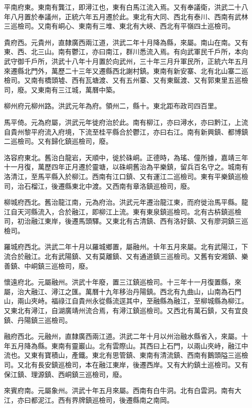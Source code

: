 平南府東。東南有龔江，即潯江也，東有白馬江流入焉。又有奉議衛，洪武二十八年八月置於奉議州，正統六年五月遷於此。東北有大同、西北有泰川、西南有武林三巡檢司。又南有峒心、東南有三堆、東北有大峽、西北有平嶺四土巡檢司。

貴府西。元貴州，直隸廣西兩江道，洪武二年十月降為縣，來屬。南山在南。又有東、西、北三山。南有鬱江，亦曰南江，群川悉流入焉。有向武軍民千戶所，本向武守御千戶所，洪武十八年十月置於向武州，三十年三月升軍民所，正統六年五月來遷縣北門外，萬歷二十三年又遷縣西北謝村鎮。東南有新安寨、北有北山寨二巡檢司。又南有橋頭墟、西有瓦塘渡、又有五州寨、又有東鋋渡、又有郭東里五巡檢司，廢。又東南有三江城，萬曆中築。

柳州府元柳州路。洪武元年為府。領州二，縣十。東北距布政司四百里。

馬平倚。元為府屬，洪武元年徙府治於此。南有柳江，亦曰潯水，亦曰黔江，上流自貴州黎平府流入府境，下流至桂平縣合於鬱江，亦曰右江。南有新興鎮、都博鎮二巡檢司。又有歸化鎮巡檢司，廢。

洛容府東北。舊治白龍岩，天順中，徙於硃峒。正德時，為瑤、僮所據，嘉靖三年十一月復，萬歷四年正月遷於靈塘，以硃峒舊治為平樂鎮，留兵百名守之。城南有洛清江，至馬平縣入於柳江。西南有江口鎮、又有運江二巡檢司。東有平樂鎮巡檢司，治石榴江，後遷縣東北中渡。又西南有章洛鎮巡檢司，廢。

柳城府西北。舊治龍江南，元為府治。洪武元年遷治龍江東，而府徙治馬平縣。龍江自天河縣流入，合於融江，即柳江上流。東有東泉鎮巡檢司。北有古枿鎮巡檢司，初治融江東岸，後遷馬頭驛。又東北有古清鎮、西有洛好鎮、又有廖洞鎮三巡檢司。

羅城府西北。洪武二年十月以羅城鄉置，屬融州。十年五月來屬。北有武陽江，下流合於融江。北有武陽鎮、又有莫離鎮、又有通道鎮三巡檢司。又舊有安湘鎮、樂善鎮、中峒鎮三巡檢司，廢。

懷遠府北。元屬融州。洪武十年廢，置三江鎮巡檢司。十三年十一月復置縣，來屬，治大融江、潯江之匯。萬曆十九年移治丹陽鎮。西北有九曲山，山南為石門山，兩山夾峙。福祿江自貴州永從縣流逕其中，至融縣為融江，至柳城縣為柳江。又東北有潯江，自湖廣靖州流合焉，有潯江鎮巡檢司。又西北有萬石鎮，又有宜良鎮、丹陽鎮三巡檢司。

融府西北。元融州，直隸廣西兩江道。洪武二年十月以州治融水縣省入，來屬。十年五月降為縣。東南有靈巖山。北有雲際山。其西曰上石門，以兩山夾峙，融江中流也。又東有寶積山，產鐵。東北有思管鎮、東南有清流鎮、西南有鵝頭隘三巡檢司。又北有長安鎮巡檢司，本在融江東岸，後遷西岸。又有大約鎮土巡檢司。又有保江鎮、理源鎮、西峒鎮三巡檢司，廢。

來賓府南。元屬象州。洪武十年五月來屬。西南有白牛洞。北有白雲洞。南有大江，亦曰都泥江。西有界牌鎮巡檢司，後遷縣南之南岡。

